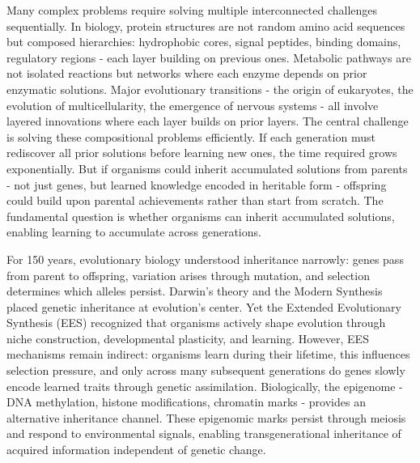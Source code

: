 \documentclass[11pt]{article}
\begin{document}
Many complex problems require solving multiple interconnected challenges sequentially. In biology, protein structures are not random amino acid sequences but composed hierarchies: hydrophobic cores, signal peptides, binding domains, regulatory regions - each layer building on previous ones. Metabolic pathways are not isolated reactions but networks where each enzyme depends on prior enzymatic solutions. Major evolutionary transitions - the origin of eukaryotes, the evolution of multicellularity, the emergence of nervous systems - all involve layered innovations where each layer builds on prior layers. The central challenge is solving these compositional problems efficiently. If each generation must rediscover all prior solutions before learning new ones, the time required grows exponentially. But if organisms could inherit accumulated solutions from parents - not just genes, but learned knowledge encoded in heritable form - offspring could build upon parental achievements rather than start from scratch. The fundamental question is whether organisms can inherit accumulated solutions, enabling learning to accumulate across generations.

For 150 years, evolutionary biology understood inheritance narrowly: genes pass from parent to offspring, variation arises through mutation, and selection determines which alleles persist\citep{Darwin1859,Huxley1942}. Darwin's theory and the Modern Synthesis placed genetic inheritance at evolution's center. Yet the Extended Evolutionary Synthesis (EES) recognized that organisms actively shape evolution through niche construction, developmental plasticity, and learning\citep{LalandEtAl2015,Uller2015,WestEberhard2003}. However, EES mechanisms remain indirect: organisms learn during their lifetime, this influences selection pressure, and only across many subsequent generations do genes slowly encode learned traits through genetic assimilation\citep{Waddington1942,HintonNowlan1987}. Biologically, the epigenome - DNA methylation, histone modifications, chromatin marks - provides an alternative inheritance channel. These epigenomic marks persist through meiosis and respond to environmental signals, enabling transgenerational inheritance of acquired information independent of genetic change\citep{JablonkaLamb2005,Pembrey2006,WaterlandJirtle2007,Jablonka2014}.
\end{document}
